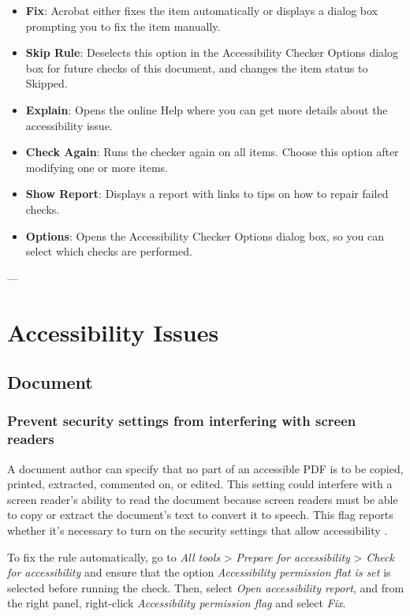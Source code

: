 \begin{itemize}
    \item \textbf{Fix}: Acrobat either fixes the item automatically or displays a dialog box prompting you to fix the item manually.
    \item \textbf{Skip Rule}: Deselects this option in the Accessibility Checker Options dialog box for future checks of this document, and changes the item status to Skipped.
    \item \textbf{Explain}: Opens the online Help where you can get more details about the accessibility issue.
    \item \textbf{Check Again}: Runs the checker again on all items. Choose this option after modifying one or more items.
    \item \textbf{Show Report}: Displays a report with links to tips on how to repair failed checks.
    \item \textbf{Options}: Opens the Accessibility Checker Options dialog box, so you can select which checks are performed.
\end{itemize}


---

\section{Accessibility Issues}
\label{sec:acrobat-accessibility-issues}

\subsection{Document}
\label{subsec:acrobat-document}
\subsubsection{Prevent security settings from interfering with screen readers}
\label{subsubsec:acrobat-security-settings}
A document author can specify that no part of an accessible PDF is to be copied, printed, extracted, commented on, or edited. This setting could interfere with a screen reader's ability to read the document because screen readers must be able to copy or extract the document's text to convert it to speech. This flag reports whether it's necessary to turn on the security settings that allow accessibility \cite{AdobeHelpX}.

To fix the rule automatically, go to \emph{All tools} > \emph{Prepare for accessibility} > \emph{Check for accessibility} and ensure that the option \emph{Accessibility permission flat is set} is selected before running the check. Then, select \emph{Open accessibility report}, and from the right panel, right-click \emph{Accessibility permission flag} and select \emph{Fix}.


